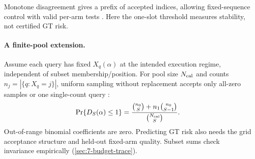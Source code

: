 Monotone disagreement gives a prefix of accepted indices, allowing fixed-sequence control with valid per-arm tests \cite{learn_then_test}. Here the one-slot threshold measures stability, not certified GT risk.

\paragraph{A finite-pool extension.}
Assume each query has fixed $X_q(\alpha)$ at the intended execution regime, independent of subset membership/position. For pool size $N_{\rm cal}$ and counts $n_j=|\{q:X_q=j\}|$, uniform sampling without replacement accepts only all-zero samples or one single-count query \cite{nist_hypergeometric}:
\begin{equation}
 \Pr\{D_S(\alpha)\leq1\}
 =\frac{\binom{n_0}{S}+n_1\binom{n_0}{S-1}}{\binom{N_{\rm cal}}{S}}.
 \label{eq:6-finite-pool}
\end{equation}
Out-of-range binomial coefficients are zero. Predicting GT risk also needs the grid acceptance structure and held-out fixed-arm quality. Subset sums check invariance empirically (\cref{sec:7-budget-trace}).